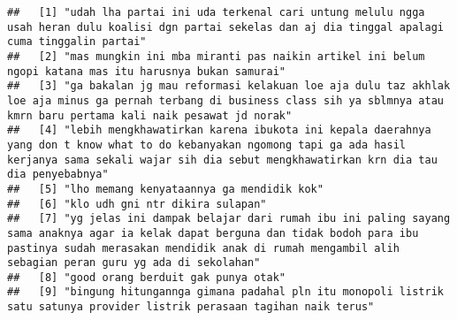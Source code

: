 \documentclass[
]{article}
\begin{document}
\begin{verbatim}
##   [1] "udah lha partai ini uda terkenal cari untung melulu ngga usah heran dulu koalisi dgn partai sekelas dan aj dia tinggal apalagi cuma tinggalin partai"                                                                                                                              
##   [2] "mas mungkin ini mba miranti pas naikin artikel ini belum ngopi katana mas itu harusnya bukan samurai"                                                                                                                                                                              
##   [3] "ga bakalan jg mau reformasi kelakuan loe aja dulu taz akhlak loe aja minus ga pernah terbang di business class sih ya sblmnya atau kmrn baru pertama kali naik pesawat jd norak"                                                                                                   
##   [4] "lebih mengkhawatirkan karena ibukota ini kepala daerahnya yang don t know what to do kebanyakan ngomong tapi ga ada hasil kerjanya sama sekali wajar sih dia sebut mengkhawatirkan krn dia tau dia penyebabnya"                                                                    
##   [5] "lho memang kenyataannya ga mendidik kok"                                                                                                                                                                                                                                           
##   [6] "klo udh gni ntr dikira sulapan"                                                                                                                                                                                                                                                    
##   [7] "yg jelas ini dampak belajar dari rumah ibu ini paling sayang sama anaknya agar ia kelak dapat berguna dan tidak bodoh para ibu pastinya sudah merasakan mendidik anak di rumah mengambil alih sebagian peran guru yg ada di sekolahan"                                             
##   [8] "good orang berduit gak punya otak"                                                                                                                                                                                                                                                 
##   [9] "bingung hitungannga gimana padahal pln itu monopoli listrik satu satunya provider listrik perasaan tagihan naik terus"                                                                                                                                                             

\end{verbatim}
\end{document}
